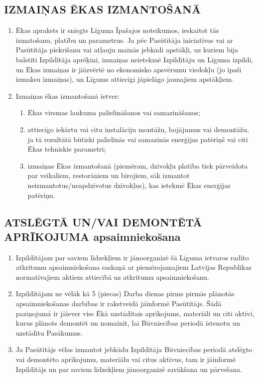 \begin{multicols}{2}
\subsection{IZMAIŅAS ĒKAS IZMANTOŠANĀ}
\begin{enumerate}
	\item Ēkas apraksts ir sniegts Līguma Īpašajos noteikumos, ieskaitot tās izmatošanu, platību un parametrus. Ja pēc Pasūtītāja iniciatīvas vai ar Pasūtītāja piekrišanu vai atļauju mainās jebkādi apstākļi, uz kuriem bija balstīti Izpildītāja aprēķini, izmaiņas neietekmē Izpildītāju un Līguma izpildi, un Ēkas izmaiņas ir jāizvērtē no ekonomisko apsvērumu viedokļu (jo īpaši izmaksu izmaiņas), un Līgums attiecīgi jāpielāgo jaunajiem apstākļiem.
	\item Izmaiņas ēkas izmantošanā ietver:
	\begin{enumerate}
		\item Ēkas virsmas laukuma palielināšanos vai samazināšanos;
		\item attiecīgo iekārtu vai citu instalāciju montāžu, bojājumus vai demontāžu, ja tā rezultātā būtiski palielinās vai samazinās enerģijas patēriņš vai citi Ēkas tehniskie parametri;
		\item izmaiņas Ēkas izmantošanā (piemēram, dzīvokļu platība tiek pārveidota par veikaliem, restorāniem un birojiem, sāk izmantot neizmantotus/neapdzīvotus dzīvokļus), kas ietekmē Ēkas enerģijas patēriņu.
	\end{enumerate}
\end{enumerate}

\subsection{ATSLĒGTĀ UN/VAI DEMONTĒTĀ APRĪKOJUMA apsaimniekošana}
\begin{enumerate}
	\item Izpildītājam par saviem līdzekļiem ir jānoorganizē šā Līguma ietvaros radīto atkritumu apsaimniekošana saskaņā ar piemērojamajiem Latvijas Republikas normatīvajiem aktiem attiecībā uz atkritumu apsaimniekošanu.
	\item Izpildītājam ne vēlāk kā 5 (piecas) Darba dienas pirms pirmās plānotās apsaimniekošanas darbības ir rakstveidā jāinformē Pasūtītājs. Šādā paziņojumā ir jāiever viss Ēkā uzstādītais aprīkojums, materiāli un citi aktīvi, kurus plānots demontēt un nomainīt, lai Būvniecības periodā īstenotu un uzstādītu Pasākumus.
	\item Ja Pasūtītājs vēlas izmantot jebkādu Izpildītāja Būvniecības periodā atslēgto vai demontēto aprīkojumu, materiālu vai citus aktīvus, tam ir jāinformē Izpildītājs un par saviem līdzekļiem jānoorganizē savākšana un pārvešana.
\end{enumerate}


\end{multicols}
